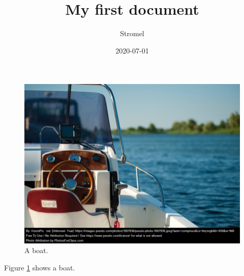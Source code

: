 \documentclass{article}
\title{My first document}
\date{2020-07-01}
\author{Stromel}
\begin{document}
	
	\begin{figure}[h!]
		\includegraphics[width=\linewidth]{boat.png}
		\caption{A boat.}
		\label{fig:boat1}
	\end{figure}
	
	Figure \ref{fig:boat1} shows a boat.
	
\end{document}
